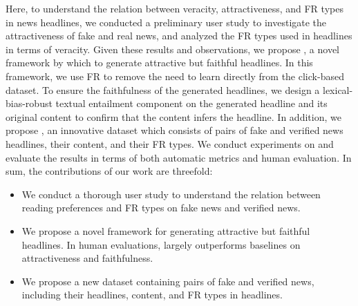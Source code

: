 Here, to understand the relation between veracity, attractiveness, and FR types
in news headlines, we conducted a preliminary user study to investigate the
attractiveness of fake and real news, and analyzed the FR types
used in headlines in terms of veracity.
Given these results and observations, we propose \modelname, a novel framework
by which to generate attractive but faithful headlines. 
In this framework, we use FR to remove the need to learn directly from the
click-based dataset.
To ensure the faithfulness of the generated headlines, we design a
lexical-bias-robust textual entailment component on the generated headline and
its original content to confirm that the content infers the headline. 
In addition, we propose \dataset, an innovative dataset which consists of pairs
of fake and verified news headlines, their content, and their FR types. We
conduct experiments on \dataset and evaluate the results in terms of both automatic
metrics and human evaluation. 
In sum, the contributions of our work are threefold:
\begin{itemize}
	 \item We conduct a thorough user study to understand the relation between
	 reading preferences and FR types on fake news and verified news. 
	 \item We propose a novel framework for generating attractive but faithful
	 headlines. In human evaluations, \modelname 
	  largely outperforms baselines on attractiveness and faithfulness.
	 \item We propose a new dataset containing pairs of fake and 
	 verified news, including their headlines, content, and FR
	 types in headlines.
\end{itemize}

